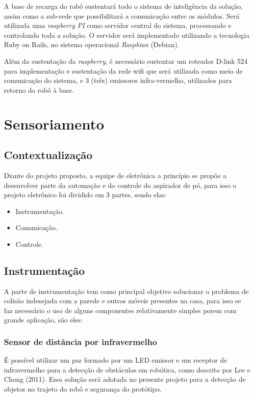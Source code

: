 	A base de recarga do robô sustentará todo o sistema de inteligência da solução, assim como a sub-rede que possibilitará a comunicação entre os módulos. Será utilizada uma \textit{raspberry PI} como servidor central do sistema, processando e controlando toda a solução. O servidor será implementado utilizando a tecnologia Ruby on Rails, no sistema operacional \textit{Raspbian} (Debian).

	Além da sustentação da \textit{raspberry}, é necessário sustentar um roteador D-link 524 para implementação e sustentação da rede wifi que será utilizada como meio de comunicação do sistema, e 3 (três) emissores infra-vermelho, utilizados para retorno do robô à base.
	

\section{Sensoriamento} %
\subsection{Contextualização}
\label{sub:contextualização}
Diante do projeto proposto, a equipe de eletrônica a princípio se propõe a desenvolver parte da automação e do controle do aspirador de pó, para isso o projeto eletrônico foi dividido em 3 partes, sendo elas:
  \begin{itemize}
    \item Instrumentação.
    \item Comunicação.
    \item Controle.
  \end{itemize}

\subsection{Instrumentação} %
\label{sub:instrumentação}


A parte de instrumentação tem como principal objetivo solucionar o problema de colisão indesejada com a parede e outros móveis presentes na casa, para isso se faz necessário o uso de alguns componentes relativamente simples porem com grande aplicação, são eles:
 
  \subsubsection{Sensor de distância por infravermelho} 
  \label{sub:Sensor_de_distância_por_infravermelho}
    É possível utilizar um par formado por um LED emissor e um receptor de infravermelho para a detecção de obstáculos em robótica, como descrito por Lee e Chong (2011).  Essa solução será adotada no presente projeto para a detecção de objetos no trajeto do robô e segurança do protótipo.\cite{detectar_objeto}

